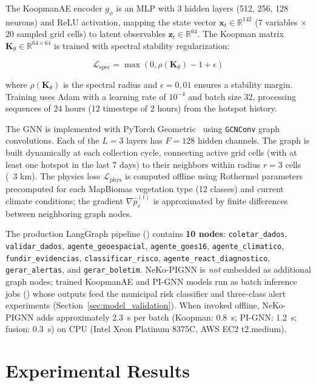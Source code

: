 \documentclass[preprint,12pt,times,numbers]{elsarticle}
\begin{document}
The KoopmanAE encoder $g_\phi$ is an MLP with 3 hidden layers (512, 256, 128 neurons) and ReLU activation, mapping the state vector $\mathbf{x}_t \in \mathbb{R}^{142}$ (7 variables $\times$ 20 sampled grid cells) to latent observables $\mathbf{z}_t \in \mathbb{R}^{64}$. The Koopman matrix $\mathbf{K}_\theta \in \mathbb{R}^{64 \times 64}$ is trained with spectral stability regularization:

\begin{equation}
\mathcal{L}_{\text{spec}} = \max(0, \rho(\mathbf{K}_\theta) - 1 + \epsilon)
\label{eq:spectral_reg}
\end{equation}

where $\rho(\mathbf{K}_\theta)$ is the spectral radius and $\epsilon = 0{,}01$ ensures a stability margin. Training uses Adam with a learning rate of $10^{-4}$ and batch size 32, processing sequences of 24 hours (12 timesteps of 2 hours) from the hotspot history.

The GNN is implemented with PyTorch Geometric~\cite{article:pyg2019} using \texttt{GCNConv} graph convolutions. Each of the $L = 3$ layers has $F = 128$ hidden channels. The graph is built dynamically at each collection cycle, connecting active grid cells (with at least one hotspot in the last 7 days) to their neighbors within radius $r = 3$ cells (~3 km). The physics loss $\mathcal{L}_{\text{phys}}$ is computed offline using Rothermel parameters precomputed for each MapBiomas vegetation type (12 classes) and current climate conditions; the gradient $\nabla \hat{p}_v^{(t)}$ is approximated by finite differences between neighboring graph nodes.

The production LangGraph pipeline () contains \textbf{10 nodes}: \texttt{coletar\_dados}, \texttt{validar\_dados}, \texttt{agente\_geoespacial}, \texttt{agente\_goes16}, \texttt{agente\_climatico}, \texttt{fundir\_evidencias}, \texttt{classificar\_risco}, \texttt{agente\_react\_diagnostico}, \texttt{gerar\_alertas}, and \texttt{gerar\_boletim}. NeKo-PIGNN is \emph{not} embedded as additional graph nodes; trained KoopmanAE and PI-GNN models run as batch inference jobs () whose outputs feed the municipal risk classifier and three-class alert experiments (Section~\ref{sec:model_validation}). When invoked offline, NeKo-PIGNN adds approximately 2.3~s per batch (Koopman: 0.8~s; PI-GNN: 1.2~s; fusion: 0.3~s) on CPU (Intel Xeon Platinum 8375C, AWS EC2 t2.medium).

\section{Experimental Results}
\label{sec:results}
\end{document}
